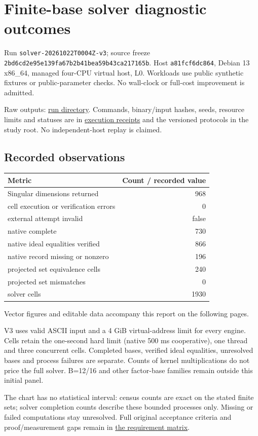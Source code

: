 \documentclass[
  10pt,
  letterpaper,
  landscape]{article}
\author{}
\date{}
\begin{document}
\section{Finite-base solver diagnostic
outcomes}\label{finite-base-solver-diagnostic-outcomes}

Run \texttt{solver-20261022T0004Z-v3}; source freeze
\texttt{2bd6cd2e95e139fa67b2b41bea59b43ca217165b}. Host
\texttt{a81fcf6dc864}, Debian 13 x86\_64, managed four-CPU virtual host,
L0. Workloads use public synthetic fixtures or public-parameter checks.
No wall-clock or full-cost improvement is admitted.

Raw outputs:
\href{../../../execution-v1/runs/solver-20261022T0004Z-v3/}{run
directory}. Commands, binary/input hashes, seeds, resource limits and
statuses are in \href{../../../execution-v1/}{execution receipts} and
the versioned protocols in the study root. No independent-host replay is
claimed.

\subsection{Recorded observations}\label{recorded-observations}

\begin{longtable}[]{@{}lr@{}}
\toprule\noalign{}
Metric & Count / recorded value \\
\midrule\noalign{}
\endhead
\bottomrule\noalign{}
\endlastfoot
Singular dimensions returned & 968 \\
cell execution or verification errors & 0 \\
external attempt invalid & false \\
native complete & 730 \\
native ideal equalities verified & 866 \\
native record missing or nonzero & 196 \\
projected set equivalence cells & 240 \\
projected set mismatches & 0 \\
solver cells & 1930 \\
\end{longtable}

Vector figures and editable data accompany this report on the following pages.

V3 uses valid ASCII input and a 4 GiB virtual-address limit for every
engine. Cells retain the one-second hard limit (native 500 ms
cooperative), one thread and three concurrent cells. Completed bases,
verified ideal equalities, unresolved bases and process failures are
separate. Counts of kernel multiplications do not price the full solver.
B=12/16 and other factor-base families remain outside this initial
panel.

The chart has no statistical interval: census counts are exact on the
stated finite sets; solver completion counts describe these bounded
processes only. Missing or failed computations stay unresolved. Full
original acceptance criteria and proof/measurement gaps remain in
\href{../../../EXPERIMENTS.md}{the requirement matrix}.
\end{document}
